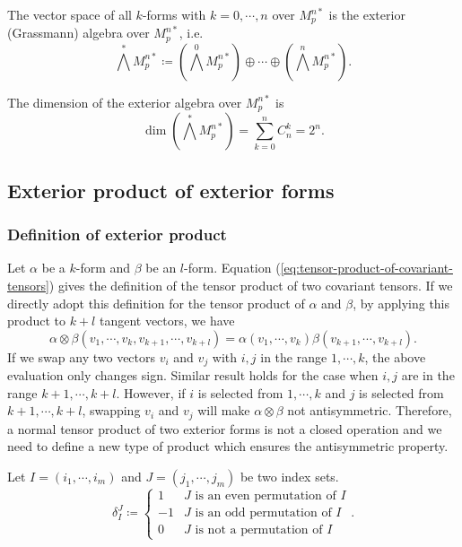 \documentclass[11pt, a4paper]{book}
\begin{document}
\begin{Definition}
  The vector space of all $k$-forms with $k=0,\cdots,n$ over $M_p^{n*}$ is the exterior
  (Grassmann) algebra over $M_p^{n*}$, i.e.
  \begin{equation}
    \label{eq:exterior-algebra}
    \bigwedge^{*} M_p^{n*} \coloneqq \left( \bigwedge^0 M_p^{n*} \right) \oplus \cdots
    \oplus \left( \bigwedge^n M_p^{n*} \right).
  \end{equation}
\end{Definition}
The dimension of the exterior algebra over $M_p^{n*}$ is
\begin{equation}
  \label{eq:exterior-algebra-dim}
  \dim \left( \bigwedge^{*} M_p^{n*} \right) = \sum_{k=0}^n C_n^k = 2^n.
\end{equation}

\subsection{Exterior product of exterior forms}

\subsubsection{Definition of exterior product}

Let $\alpha$ be a $k$-form and $\beta$ be an $l$-form. Equation
(\ref{eq:tensor-product-of-covariant-tensors}) gives the definition of the tensor product
of two covariant tensors. If we directly adopt this definition for the tensor product of
$\alpha$ and $\beta$, by applying this product to $k+l$ tangent vectors, we have
\begin{equation}
  \alpha \otimes \beta (v_1,\cdots,v_k,v_{k+1},\cdots,v_{k+l}) = \alpha(v_1,\cdots,v_k) \beta(v_{k+1},\cdots,v_{k+l}).
\end{equation}
If we swap any two vectors $v_i$ and $v_j$ with $i,j$ in the range $1,\cdots,k$, the above
evaluation only changes sign. Similar result holds for the case when $i,j$ are in the
range $k+1,\cdots,k+l$. However, if $i$ is selected from $1,\cdots,k$ and $j$ is selected
from $k+1,\cdots,k+l$, swapping $v_i$ and $v_j$ will make $\alpha\otimes\beta$ not
antisymmetric. Therefore, a normal tensor product of two exterior forms is not a closed
operation and we need to define a new type of product which ensures the antisymmetric
property.

\begin{Definition}
  Let $I = (i_1,\cdots,i_m)$ and $J = (j_1,\cdots,j_m)$ be two index sets.
  \begin{equation}
    \label{eq:kronecker-delta}
    \delta_I^J \coloneqq
    \begin{cases}
      1 & \text{$J$ is an even permutation of $I$} \\
      -1 & \text{$J$ is an odd permutation of $I$} \\
      0 & \text{$J$ is not a permutation of $I$}
    \end{cases}.
  \end{equation}
\end{Definition}
\end{document}
